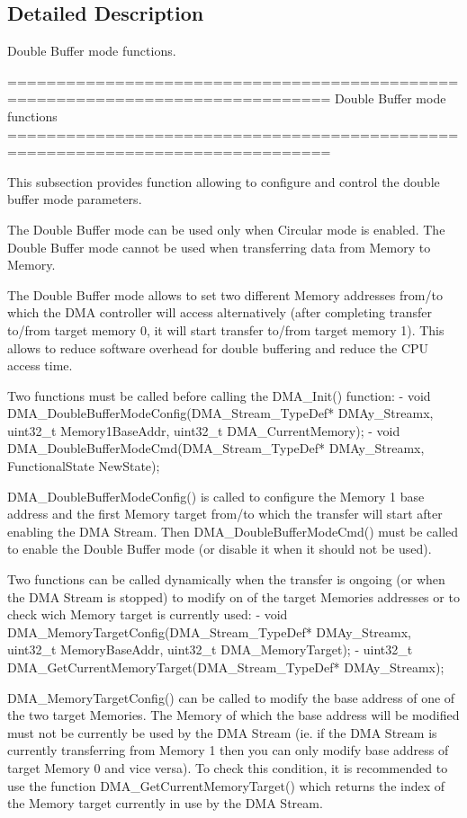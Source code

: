 \subsection{Detailed Description}
Double Buffer mode functions. 

\begin{DoxyVerb} ===============================================================================
                         Double Buffer mode functions
 ===============================================================================  

  This subsection provides function allowing to configure and control the double 
  buffer mode parameters.
  
  The Double Buffer mode can be used only when Circular mode is enabled.
  The Double Buffer mode cannot be used when transferring data from Memory to Memory.
  
  The Double Buffer mode allows to set two different Memory addresses from/to which
  the DMA controller will access alternatively (after completing transfer to/from target
  memory 0, it will start transfer to/from target memory 1).
  This allows to reduce software overhead for double buffering and reduce the CPU
  access time.

  Two functions must be called before calling the DMA_Init() function:
   - void DMA_DoubleBufferModeConfig(DMA_Stream_TypeDef* DMAy_Streamx, uint32_t Memory1BaseAddr,
                                uint32_t DMA_CurrentMemory);
   - void DMA_DoubleBufferModeCmd(DMA_Stream_TypeDef* DMAy_Streamx, FunctionalState NewState);
   
  DMA_DoubleBufferModeConfig() is called to configure the Memory 1 base address and the first
  Memory target from/to which the transfer will start after enabling the DMA Stream.
  Then DMA_DoubleBufferModeCmd() must be called to enable the Double Buffer mode (or disable 
  it when it should not be used).
  
   
  Two functions can be called dynamically when the transfer is ongoing (or when the DMA Stream is 
  stopped) to modify on of the target Memories addresses or to check wich Memory target is currently
   used:
    - void DMA_MemoryTargetConfig(DMA_Stream_TypeDef* DMAy_Streamx, uint32_t MemoryBaseAddr,
                            uint32_t DMA_MemoryTarget);
    - uint32_t DMA_GetCurrentMemoryTarget(DMA_Stream_TypeDef* DMAy_Streamx);

  DMA_MemoryTargetConfig() can be called to modify the base address of one of the two target Memories.
  The Memory of which the base address will be modified must not be currently be used by the DMA Stream
  (ie. if the DMA Stream is currently transferring from Memory 1 then you can only modify base address
  of target Memory 0 and vice versa).
  To check this condition, it is recommended to use the function DMA_GetCurrentMemoryTarget() which
  returns the index of the Memory target currently in use by the DMA Stream.\end{DoxyVerb}
 

